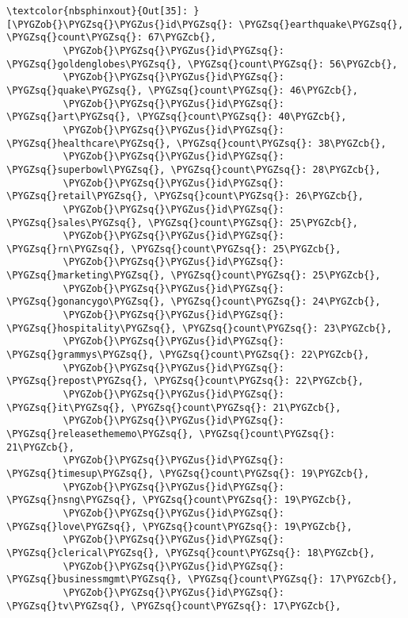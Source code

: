 \documentclass[letterpaper,10pt,english]{sphinxmanual}
\begin{document}
%
\begin{Verbatim}[commandchars=\\\{\}]
\textcolor{nbsphinxout}{Out[35]: }[\PYGZob{}\PYGZsq{}\PYGZus{}id\PYGZsq{}: \PYGZsq{}earthquake\PYGZsq{}, \PYGZsq{}count\PYGZsq{}: 67\PYGZcb{},
          \PYGZob{}\PYGZsq{}\PYGZus{}id\PYGZsq{}: \PYGZsq{}goldenglobes\PYGZsq{}, \PYGZsq{}count\PYGZsq{}: 56\PYGZcb{},
          \PYGZob{}\PYGZsq{}\PYGZus{}id\PYGZsq{}: \PYGZsq{}quake\PYGZsq{}, \PYGZsq{}count\PYGZsq{}: 46\PYGZcb{},
          \PYGZob{}\PYGZsq{}\PYGZus{}id\PYGZsq{}: \PYGZsq{}art\PYGZsq{}, \PYGZsq{}count\PYGZsq{}: 40\PYGZcb{},
          \PYGZob{}\PYGZsq{}\PYGZus{}id\PYGZsq{}: \PYGZsq{}healthcare\PYGZsq{}, \PYGZsq{}count\PYGZsq{}: 38\PYGZcb{},
          \PYGZob{}\PYGZsq{}\PYGZus{}id\PYGZsq{}: \PYGZsq{}superbowl\PYGZsq{}, \PYGZsq{}count\PYGZsq{}: 28\PYGZcb{},
          \PYGZob{}\PYGZsq{}\PYGZus{}id\PYGZsq{}: \PYGZsq{}retail\PYGZsq{}, \PYGZsq{}count\PYGZsq{}: 26\PYGZcb{},
          \PYGZob{}\PYGZsq{}\PYGZus{}id\PYGZsq{}: \PYGZsq{}sales\PYGZsq{}, \PYGZsq{}count\PYGZsq{}: 25\PYGZcb{},
          \PYGZob{}\PYGZsq{}\PYGZus{}id\PYGZsq{}: \PYGZsq{}rn\PYGZsq{}, \PYGZsq{}count\PYGZsq{}: 25\PYGZcb{},
          \PYGZob{}\PYGZsq{}\PYGZus{}id\PYGZsq{}: \PYGZsq{}marketing\PYGZsq{}, \PYGZsq{}count\PYGZsq{}: 25\PYGZcb{},
          \PYGZob{}\PYGZsq{}\PYGZus{}id\PYGZsq{}: \PYGZsq{}gonancygo\PYGZsq{}, \PYGZsq{}count\PYGZsq{}: 24\PYGZcb{},
          \PYGZob{}\PYGZsq{}\PYGZus{}id\PYGZsq{}: \PYGZsq{}hospitality\PYGZsq{}, \PYGZsq{}count\PYGZsq{}: 23\PYGZcb{},
          \PYGZob{}\PYGZsq{}\PYGZus{}id\PYGZsq{}: \PYGZsq{}grammys\PYGZsq{}, \PYGZsq{}count\PYGZsq{}: 22\PYGZcb{},
          \PYGZob{}\PYGZsq{}\PYGZus{}id\PYGZsq{}: \PYGZsq{}repost\PYGZsq{}, \PYGZsq{}count\PYGZsq{}: 22\PYGZcb{},
          \PYGZob{}\PYGZsq{}\PYGZus{}id\PYGZsq{}: \PYGZsq{}it\PYGZsq{}, \PYGZsq{}count\PYGZsq{}: 21\PYGZcb{},
          \PYGZob{}\PYGZsq{}\PYGZus{}id\PYGZsq{}: \PYGZsq{}releasethememo\PYGZsq{}, \PYGZsq{}count\PYGZsq{}: 21\PYGZcb{},
          \PYGZob{}\PYGZsq{}\PYGZus{}id\PYGZsq{}: \PYGZsq{}timesup\PYGZsq{}, \PYGZsq{}count\PYGZsq{}: 19\PYGZcb{},
          \PYGZob{}\PYGZsq{}\PYGZus{}id\PYGZsq{}: \PYGZsq{}nsng\PYGZsq{}, \PYGZsq{}count\PYGZsq{}: 19\PYGZcb{},
          \PYGZob{}\PYGZsq{}\PYGZus{}id\PYGZsq{}: \PYGZsq{}love\PYGZsq{}, \PYGZsq{}count\PYGZsq{}: 19\PYGZcb{},
          \PYGZob{}\PYGZsq{}\PYGZus{}id\PYGZsq{}: \PYGZsq{}clerical\PYGZsq{}, \PYGZsq{}count\PYGZsq{}: 18\PYGZcb{},
          \PYGZob{}\PYGZsq{}\PYGZus{}id\PYGZsq{}: \PYGZsq{}businessmgmt\PYGZsq{}, \PYGZsq{}count\PYGZsq{}: 17\PYGZcb{},
          \PYGZob{}\PYGZsq{}\PYGZus{}id\PYGZsq{}: \PYGZsq{}tv\PYGZsq{}, \PYGZsq{}count\PYGZsq{}: 17\PYGZcb{},

\end{Verbatim}
\end{document}
